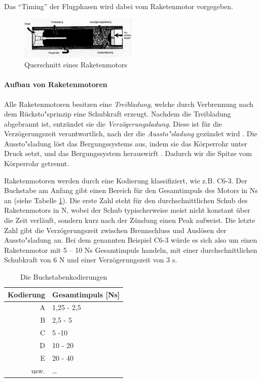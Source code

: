 \documentclass[10pt,a4paper]{article}
\begin{document}
\noindent
Das "`Timing"' der Flugphasen wird dabei vom Raketenmotor vorgegeben.
 
\begin{figure}[h]
	\centering
	\includegraphics[width=0.5\textwidth]{Bilder/Raketenmotor-Schema.png}
	\caption{Querschnitt eines Raketenmotors \cite{om}}
\end{figure}

\paragraph{Aufbau von Raketenmotoren}
Alle Raketenmotoren besitzen eine \textit{Treibladung}, welche durch Verbrennung nach dem Rücksto"sprinzip eine Schubkraft erzeugt.
Nachdem die Treibladung abgebrannt ist, entzündet sie die \textit{Verzögerungsladung}. Diese ist für die Verzögerungszeit verantwortlich, nach der die \textit{Aussto"sladung} gezündet wird \cite{sn}.
Die Aussto"sladung löst das  Bergungssystems aus, indem sie das Körperrohr unter Druck setzt, und das Bergungssystem herauswirft \cite{om}. Dadurch wir die Spitze vom Körperrohr getrennt.

Raketenmotoren werden durch eine Kodierung klassifiziert, wie z.B. \textsf{C6-3}. Der Buchstabe am Anfang gibt einen Bereich für den Gesamtimpuls des Motors in Ns an (siehe Tabelle \ref{tab-Motorkodierungen}).
Die erste Zahl steht für den durchschnittlichen Schub des Raketenmotors in N, wobei der Schub typischerweise meist nicht konstant über die Zeit verläuft, sondern kurz nach der Zündung einen Peak aufweist.
Die letzte Zahl gibt die Verzögerungszeit zwischen Brennschluss und Auslösen der Aussto"sladung an. Bei dem genannten Beispiel \textsf{C6-3} würde es sich also um einen Raketenmotor mit 5 -- 10 Ns Gesamtimpuls handeln, mit einer durchschnittlichen Schubkraft von 6 N und einer Verzögerungszeit von 3 s. 

\begin{table}[H]
\caption{Die Buchstabenkodierungen}
\label{tab-Motorkodierungen}
\centering
\begin{tabular}{r|l}
	\toprule
	Kodierung & Gesamtimpuls [Ns] \\
	\midrule
	A & 1,25 - 2,5 \\
	B & 2,5 - 5 \\
	C & 5 -10 \\
	D & 10 - 20 \\
	E & 20 - 40 \\
	usw. & \dots \\
	\bottomrule
\end{tabular}
\end{table}
\end{document}
